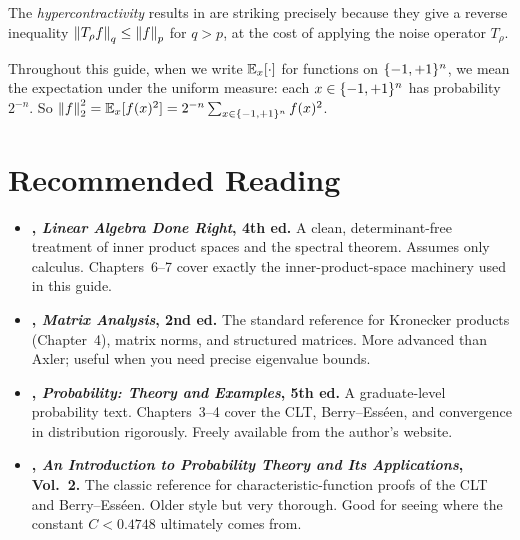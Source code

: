 The \emph{hypercontractivity} results in
 are striking precisely because they give a reverse
inequality $\left\| T_\rho f \right\|_q \leq \left\| f \right\|_p$ for $q > p$, at the cost
of applying the noise operator $T_\rho$.

\begin{remark}[Notation]
Throughout this guide, when we write $\mathbb{E}_x[\cdot]$ for functions on
$\{-1,+1\}^n$, we mean the expectation under the uniform measure: each
$x \in \{-1,+1\}^n$ has probability $2^{-n}$. So
$\left\| f \right\|_2^2 = \mathbb{E}_x[f(x)^2] = 2^{-n} \sum_{x \in \{-1,+1\}^n} f(x)^2$.
\end{remark}


\section*{Recommended Reading}

\begin{itemize}
  \item \textbf{\citet{axler2024linear}, \emph{Linear Algebra Done Right},
    4th ed.}
    A clean, determinant-free treatment of inner product spaces and the
    spectral theorem. Assumes only calculus. Chapters~6--7 cover exactly
    the inner-product-space machinery used in this guide.

  \item \textbf{\citet{horn2012matrix}, \emph{Matrix Analysis}, 2nd ed.}
    The standard reference for Kronecker products (Chapter~4), matrix
    norms, and structured matrices. More advanced than Axler; useful when
    you need precise eigenvalue bounds.

  \item \textbf{\citet{durrett2019probability}, \emph{Probability: Theory
    and Examples}, 5th ed.}
    A graduate-level probability text. Chapters~3--4 cover the CLT,
    Berry--Ess\'een, and convergence in distribution rigorously. Freely
    available from the author's website.

  \item \textbf{\citet{feller1971introduction}, \emph{An Introduction to
    Probability Theory and Its Applications}, Vol.~2.}
    The classic reference for characteristic-function proofs of the CLT
    and Berry--Ess\'een. Older style but very thorough. Good for seeing
    where the constant $C < 0.4748$ ultimately comes from.
\end{itemize}
